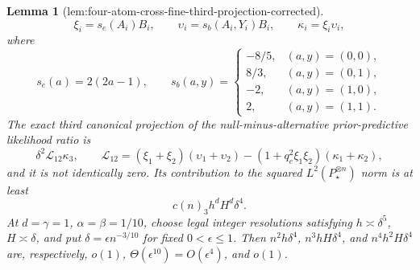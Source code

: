 \documentclass{article}
\newtheorem{lemma}{Lemma}
\begin{document}
\begin{lemma}[lem:four-atom-cross-fine-third-projection-corrected]
\[
 \xi_i=s_e(A_i)B_i,
 \qquad \upsilon_i=s_b(A_i,Y_i)B_i,
 \qquad \kappa_i=\xi_i\upsilon_i,
\]
where
\[
 s_e(a)=2(2a-1),
 \qquad
 s_b(a,y)=\begin{cases}
 -8/5,&(a,y)=(0,0),\\
 8/3,&(a,y)=(0,1),\\
 -2,&(a,y)=(1,0),\\
 2,&(a,y)=(1,1).
 \end{cases}
\]
The exact third canonical projection of the null-minus-alternative prior-predictive likelihood ratio is
\[
 \delta^2\mathcal L_{12}\kappa_3,
 \qquad
 \mathcal L_{12}
 =(\xi_1+\xi_2)(\upsilon_1+\upsilon_2)
 -(1+q_e^2\xi_1\xi_2)(\kappa_1+\kappa_2),
 \tag{8}
\]
and it is not identically zero.  Its contribution to the squared \(L^2(P_\star^{\otimes n})\) norm is at least
\[
 c(n)_3h^dH^d\delta^4.
 \tag{9}
\]
At \(d=\gamma=1\), \(\alpha=\beta=1/10\), choose legal integer resolutions satisfying \(h\asymp\delta^5\), \(H\asymp\delta\), and put \(\delta=\epsilon n^{-3/10}\) for fixed \(0<\epsilon\leq1\).  Then \(n^2h\delta^4\), \(n^3hH\delta^4\), and \(n^4h^2H\delta^4\) are, respectively, \(o(1)\), \(\Theta(\epsilon^{10})=O(\epsilon^4)\), and \(o(1)\).
\end{lemma}
\end{document}
